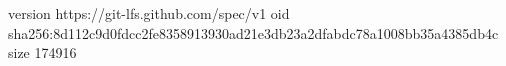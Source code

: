 version https://git-lfs.github.com/spec/v1
oid sha256:8d112c9d0fdcc2fe8358913930ad21e3db23a2dfabdc78a1008bb35a4385db4c
size 174916
